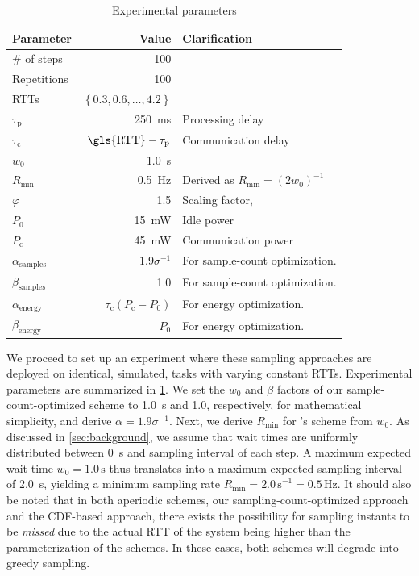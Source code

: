 \begin{table}
    \centering
    \caption{Experimental parameters}\label{tab:params}
    \begin{tabular}{lrl}
        \toprule
        Parameter & Value & Clarification \\
        \midrule
        \# of steps & \num{100} & \\
        Repetitions & \num{100} & \\
        \glspl{RTT} & \( \left\{ 0.3, 0.6,\ldots,4.2 \right\} \) & \\
        \( \tau_\text{p} \) & \SI{250}{\milli\second} & Processing delay \\
        \( \tau_\text{c} \) & \( \text{\gls{RTT}} - \tau_\text{p} \) & Communication delay \\
        \( w_0 \) & \SI{1.0}{\second} & \\
        \( R_\text{min} \) & \SI{0.5}{\hertz} & Derived as \( R_\text{min} = {(2 w_0)}^{-1} \) \\
        \( \varphi \) & \num{1.5} & Scaling factor, \textcite{wang2019towards}\\
        \( P_0 \) & \SI{15}{\milli\watt} & Idle power \\
        \( P_\text{c} \) & \SI{45}{\milli\watt} & Communication power \\
        \( \alpha_\text{samples} \) & \( 1.9 \sigma^{-1} \) & For sample-count optimization. \\
        \( \beta_\text{samples} \) & \num{1.0} & For sample-count optimization. \\
        \( \alpha_\text{energy} \) & \( \tau_\text{c}(P_\text{c} - P_0) \) & For energy optimization. \\
        \( \beta_\text{energy} \) & \( P_0 \) & For energy optimization. \\
        \bottomrule
    \end{tabular}
\end{table}

We proceed to set up an experiment where these sampling approaches are deployed on identical, simulated, tasks with varying constant \glspl{RTT}.
Experimental parameters are summarized in \cref{tab:params}.
We set the \( w_0 \) and \( \beta \) factors of our sample-count-optimized scheme to \SI{1.0}{\second} and \num{1.0}, respectively, for mathematical simplicity, and derive \( \alpha = 1.9 \sigma^{-1} \).
Next, we derive \( R_\text{min} \) for \textcite{wang2019towards}'s scheme from \( w_0 \).
As discussed in \cref{sec:background}, we assume that wait times are uniformly distributed between \SI{0}{\second} and sampling interval of each step.
A maximum expected wait time \( w_0 = 1.0\,\si{\second} \) thus translates into a maximum expected sampling interval of \SI{2.0}{\second}, yielding a minimum sampling rate \( R_\text{min} = {2.0\,\si{\second}}^{-1} = 0.5\,\si{\hertz} \).
It should also be noted that in both aperiodic schemes, our sampling-count-optimized approach and the \gls{CDF}-based approach, there exists the possibility for sampling instants to be \emph{missed} due to the actual \gls{RTT} of the system being higher than the parameterization of the schemes.
In these cases, both schemes will degrade into greedy sampling.

